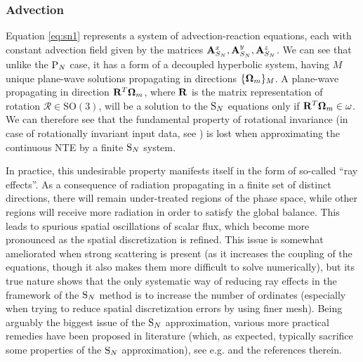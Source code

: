 \subsubsection{Advection}
Equation \eqref{eq:sn1} represents a system of advection-reaction equations, each with constant advection field given by
the matrices $\mathbf{A}_{S_N}^x, \mathbf{A}_{S_N}^y, \mathbf{A}_{S_N}^z$. We can see that unlike the $\text{P}_{N}$ case, it has a
form of a decoupled hyperbolic system, having $M$ unique plane-wave solutions propagating in directions $\{\mathbf{\Omega}_m\}_{M}$. A
plane-wave propagating in direction $\mathbf{R}^T\mathbf{\Omega}_m$, where $\mathbf{R}$ is the matrix representation of rotation
$\mathcal{R}\in \mathrm{SO}(3)$, will be a solution to the $\text{S}_{N}$ equations only if $\mathbf{R}^T\mathbf{\Omega}_m \in \omega$. We
can therefore see that the fundamental property of rotational invariance (in case of rotationally invariant input data,
see ) is lost when approximating the continuous NTE by a finite $\text{S}_{N}$ system.

In practice, this undesirable property manifests itself in the form of so-called ``ray effects''. As a consequence of
radiation propagating in a finite set of distinct directions, there will remain under-treated regions of the phase
space, while other regions will receive more radiation in order to satisfy the global balance. This leads to spurious spatial oscillations
of scalar flux, which become more pronounced as the spatial discretization is refined.
This issue is somewhat ameliorated when strong scattering is present (as it increases the coupling of the equations,
though it also makes them more difficult to solve numerically), but its true nature shows that the only systematic way
of reducing ray effects in the framework of the $\text{S}_{N}$ method is to increase the number of ordinates (especially when
trying to reduce spatial discretization errors by using finer mesh). Being arguably the biggest issue of the $\text{S}_{N}$ approximation, various more practical
remedies have been proposed in literature (which, as expected, typically sacrifice some properties of the $\text{S}_{N}$
approximation), see e.g. \cite{Li1} and the references therein.

